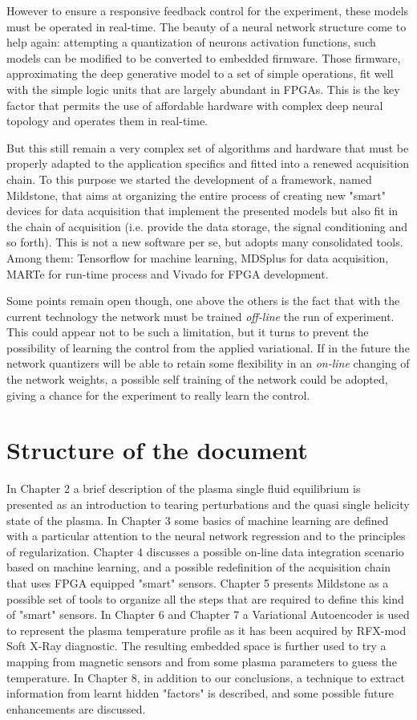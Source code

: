 However to ensure a responsive feedback control for the experiment, these models must be operated in real-time.
The beauty of a neural network structure come to help again: attempting a quantization of neurons activation functions, such models can be modified to be converted to embedded firmware. Those firmware, approximating the deep generative model to a set of simple operations, fit well with the simple logic units that are largely abundant in FPGAs. This is the key factor that permits the use of affordable hardware with complex deep neural topology and operates them in real-time. 

But this still remain a very complex set of algorithms and hardware that must be properly adapted to the application specifics and fitted into a renewed acquisition chain.
To this purpose we started the development of a framework, named Mildstone, that aims at organizing the entire process of creating new "smart" devices for data acquisition that implement the presented models but also fit in the chain of acquisition (i.e. provide the data storage, the signal conditioning and so forth).
This is not a new software per se, but adopts many consolidated tools. Among them: Tensorflow for machine learning, MDSplus for data acquisition, MARTe for run-time process and Vivado for FPGA development.

Some points remain open though, one above the others is the fact that with the current technology the network must be trained \textit{off-line} the run of experiment. This could appear not to be such a limitation, but it turns to prevent the possibility of learning the control from the applied variational. If in the future the network quantizers will be able to retain some flexibility in an \textit{on-line} changing of the network weights, a possible self training of the network could be adopted, giving a chance for the experiment to really learn the control.


\section{Structure of the document}
In Chapter 2 a brief description of the plasma single fluid equilibrium is presented as an introduction to tearing perturbations and the quasi single helicity state of the plasma. 
In Chapter 3 some basics of machine learning are defined with a particular attention to the neural network regression and to the principles of regularization. 
Chapter 4 discusses a possible on-line data integration scenario based on machine learning, and a possible redefinition of the acquisition chain that uses FPGA equipped "smart" sensors.
Chapter 5 presents Mildstone as a possible set of tools to organize all the steps that are required to define this kind of "smart" sensors.
In Chapter 6 and Chapter 7 a Variational Autoencoder is used to represent the plasma temperature profile as it has been acquired by RFX-mod Soft X-Ray diagnostic. The resulting embedded space is further used to try a mapping from magnetic sensors and from some plasma parameters to guess the temperature.
In Chapter 8, in addition to our conclusions, a technique to extract information from learnt hidden "factors" is described, and some possible future enhancements are discussed.